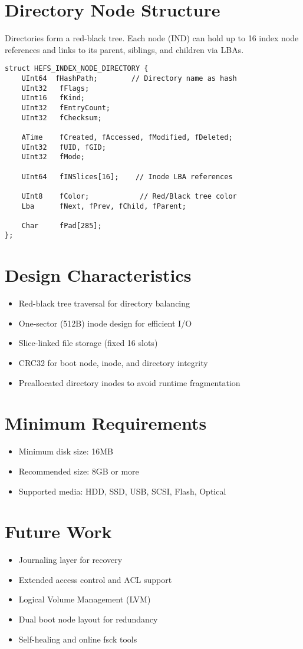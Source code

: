\documentclass{article}
\begin{document}
\section{Directory Node Structure}
Directories form a red-black tree. Each node (IND) can hold up to 16 index node references and links to its parent, siblings, and children via LBAs.

\begin{lstlisting}[style=cstyle, caption={HEFS\_INDEX\_NODE\_DIRECTORY}]
struct HEFS_INDEX_NODE_DIRECTORY {
    UInt64  fHashPath;        // Directory name as hash
    UInt32   fFlags;
    UInt16   fKind;
    UInt32   fEntryCount;
    UInt32   fChecksum;

    ATime    fCreated, fAccessed, fModified, fDeleted;
    UInt32   fUID, fGID;
    UInt32   fMode;

    UInt64   fINSlices[16];    // Inode LBA references

    UInt8    fColor;            // Red/Black tree color
    Lba      fNext, fPrev, fChild, fParent;

    Char     fPad[285];
};
\end{lstlisting}

\section{Design Characteristics}

\begin{itemize}
    \item Red-black tree traversal for directory balancing
    \item One-sector (512B) inode design for efficient I/O
    \item Slice-linked file storage (fixed 16 slots)
    \item CRC32 for boot node, inode, and directory integrity
    \item Preallocated directory inodes to avoid runtime fragmentation
\end{itemize}

\section{Minimum Requirements}

\begin{itemize}
    \item Minimum disk size: 16MB
    \item Recommended size: 8GB or more
    \item Supported media: HDD, SSD, USB, SCSI, Flash, Optical
\end{itemize}

\section{Future Work}
\begin{itemize}
    \item Journaling layer for recovery
    \item Extended access control and ACL support
    \item Logical Volume Management (LVM)
    \item Dual boot node layout for redundancy
    \item Self-healing and online fsck tools
\end{itemize}
\end{document}
